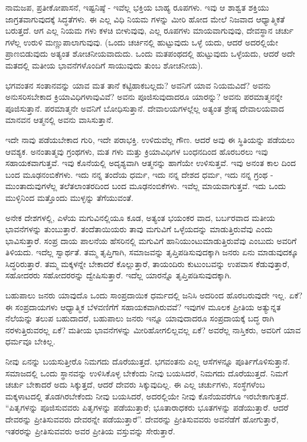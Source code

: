 ನಾಮಜಪ, ಪ್ರತೀಕೋಪಾಸನೆ, ಇಷ್ಟನಿಷ್ಠೆ - ಇವೆಲ್ಲ ಭಕ್ತಿಯ ಬಾಹ್ಯ ರೂಪಗಳು. ಇವು ಆ ಶಾಶ್ವತ ಶಕ್ತಿಯು ಜಾಗ್ರತವಾಗುವುದಕ್ಕೆ ಸಿದ್ಧತೆಗಳು. ಈ ಎಲ್ಲ ವಿಧಿ ನಿಯಮ ಗಳನ್ನು ಮೀರಿ ಹೋದ ಮೇಲೆ ನಿಜವಾದ ಆಧ್ಯಾತ್ಮಿಕತೆ ಬರುತ್ತದೆ. ಆಗ ಎಲ್ಲ ನಿಯಮ ಗಳು ಕಳಚಿ ಬೀಳುವುವು, ಎಲ್ಲ ರೂಪಗಳು ಮಾಯವಾಗುವುವು, ದೇವಸ್ಥಾನ ಚರ್ಚು ಗಳೆಲ್ಲ ಉರುಳಿ ಮಣ್ಣುಪಾಲಾಗುವುವು. (ಒಂದು ಚರ್ಚಿನಲ್ಲಿ ಹುಟ್ಟುವುದು ಒಳ್ಳೆ ಯದು, ಆದರೆ ಅದರಲ್ಲಿಯೇ ಪ್ರಾಣಬಿಡುವುದು ಅತ್ಯಂತ ಶೋಚನೀಯವಾದುದು. ಒಂದು ಮತಪಂಥದಲ್ಲಿ ಹುಟ್ಟುವುದು ಒಳ್ಳೆಯದು, ಆದರೆ ಅದೇ ಮತದಲ್ಲಿ ಮತೀಯ ಭಾವನೆಗಳೊಂದಿಗೆ ಸಾಯುವುದು ತುಂಬ ಶೋಚನೀಯ).

ಭಗವಂತನ ಸಂತಾನವನ್ನು ಯಾವ ಮತ ತಾನೆ ಕಟ್ಟಿಹಾಕಬಲ್ಲದು? ಅವನಿಗೆ ಯಾವ ನಿಯಮವಿದೆ? ಅವನು ಅನುಸರಿಸಬೇಕಾದ ಕ್ರಿಯಾವಿಧಿಗಳಾವುವಿವೆ? ಅವನು ಪೂಜಿಸುವುದಾದರೂ ಯಾರನ್ನು? ಅವನು ಪರಮಾತ್ಮನನ್ನೇ ಪೂಜಿಸುತ್ತಾನೆ. ಪರಮಾತ್ಮನೇ ಅವನಿಗೆ ಬೋಧಿಸುತ್ತಾನೆ. ದೇವಾಲಯಗಳಲ್ಲೆಲ್ಲ ಅತ್ಯಂತ ಶ್ರೇಷ್ಠ ದೇವಾಲಯವಾದ ಮಾನವನ ಆತ್ಮನಲ್ಲಿ ಅವನು ವಾಸಿಸುತ್ತಾನೆ.

ಇದೇ ನಾವು ಪಡೆಯಬೇಕಾದ ಗುರಿ, ಇದೇ ಪರಾಭಕ್ತಿ. ಉಳಿದುವೆಲ್ಲ ಗೌಣ. ಆದರೆ ಅವು ಈ ಸ್ಥಿತಿಯನ್ನು ಪಡೆಯಲು ಆವಶ್ಯಕ. ಅನಂತಾತ್ಮವು ಗ್ರಂಥಗಳು, ಮತ ಗಳು ಮತ್ತು ಕ್ರಿಯಾವಿಧಿಗಳ ಬಂಧನದಿಂದ ಹೊರಬರಲು ಇವು ಸಹಾಯಕವಾಗುತ್ತವೆ. ಇವು ಕೊನೆಯಲ್ಲಿ ಅದೃಶ್ಯವಾಗಿ ಆತ್ಮನನ್ನು ಹಾಗೆಯೇ ಉಳಿಸುತ್ತವೆ. ಇವು ಅನಂತ ಕಾಲ ದಿಂದ ಬಂದ ಮೂಢನಂಬಿಕೆಗಳು. ಇದು ನನ್ನ ತಂದೆಯ ಧರ್ಮ, ಇದು ನನ್ನ ದೇಶದ ಧರ್ಮ, ಇದು ನನ್ನ ಗ್ರಂಥ - ಮುಂತಾದುವುಗಳೆಲ್ಲ ತಲೆತಲಾಂತರದಿಂದ ಬಂದ ಮೂಢನಂಬಿಕೆಗಳು. ಇವೆಲ್ಲ ಮಾಯವಾಗುತ್ತವೆ. ಇದು ಒಂದು ಮುಳ್ಳಿನಿಂದ ಮತ್ತೊಂದು ಮುಳ್ಳನ್ನು ತೆಗೆಯುವಂತೆ.

ಅನೇಕ ದೇಶಗಳಲ್ಲಿ, ಎಳೆಯ ಮಗುವಿನಲ್ಲಿಯೂ ಕೂಡ, ಅತ್ಯಂತ ಭಯಂಕರ ವಾದ, ಬರ್ಬರವಾದ ಮತೀಯ ಭಾವನೆಗಳನ್ನು ತುಂಬುತ್ತಾರೆ. ತಂದೆತಾಯಿಯರು ತಾವು ಮಗುವಿಗೆ ಒಳ್ಳೆಯದನ್ನು ಮಾಡುತ್ತಿರುವೆವು ಎಂದು ಭಾವಿಸುತ್ತಾರೆ. ಸಂಪ್ರ ದಾಯ ಪಾಲನೆಯ ಹೆಸರಿನಲ್ಲಿ ಮಗುವಿಗೆ ಹಾನಿಯುಂಟುಮಾಡುತ್ತಿರುವೆವು ಎಂಬುದು ಅವರಿಗೆ ತಿಳಿಯದು. ಇದೆಲ್ಲ ಸ್ವಾರ್ಥತೆ. ತಮ್ಮ ತೃಪ್ತಿಗಾಗಿ, ಸಮಾಜವನ್ನು ತೃಪ್ತಿಪಡಿಸುವುದಕ್ಕಾಗಿ ಜನರು ಏನು ಮಾಡುವುದಕ್ಕೂ ಸಿದ್ಧರಿರುತ್ತಾರೆ. ತಮ್ಮ ಮಕ್ಕಳನ್ನೇ ಬೇಕಾದರೆ ಕೊಲ್ಲುತ್ತಾರೆ, ತಾಯಂದಿರು ಕುಟುಂಬವನ್ನು ಉಪವಾಸ ಕೆಡುವುತ್ತಾರೆ, ಸಹೋದರರು ಸಹೋದರರನ್ನು ದ್ವೇಷಿಸುತ್ತಾರೆ. ಇದೆಲ್ಲ ಯಾರನ್ನೊ ತೃಪ್ತಿಪಡಿಸುವುದಕ್ಕಾಗಿ.

ಬಹುಪಾಲು ಜನರು ಯಾವುದೊ ಒಂದು ಸಾಂಪ್ರದಾಯಿಕ ಧರ್ಮದಲ್ಲಿ ಜನಿಸಿ ಅದರಿಂದ ಹೊರಬರುವುದೇ ಇಲ್ಲ. ಏಕೆ? ಈ ಸಂಪ್ರದಾಯಗಳು ಆಧ್ಯಾತ್ಮಿಕ ಬೆಳವಣಿಗೆಗೆ ಸಹಾಯಕವಾಗಿರುವವೆ? ಇವುಗಳ ಮೂಲಕ ಪ್ರೀತಿಯ ಅತ್ಯುನ್ನತ ನೆಲೆಯನ್ನು ತಲುಪ ಬಹುದಾದರೆ, ಬಹುಪಾಲು ಜನರು ಇನ್ನೂ ಯಾವುದಾದರೂ ಸಂಪ್ರದಾಯಕ್ಕೆ ಬದ್ಧ ರಾಗಿ ನರಳುತ್ತಿರುವರಲ್ಲ ಏಕೆ? ಮತೀಯ ಭಾವನೆಗಳನ್ನು ಮೀರಿಹೋಗಲಿಲ್ಲವಲ್ಲ ಏಕೆ? ಅವರೆಲ್ಲ ನಾಸ್ತಿಕರು, ಅವರಿಗೆ ಯಾವ ಧರ್ಮವೂ ಬೇಕಿಲ್ಲ.

ನೀವು ಏನನ್ನು ಬಯಸುತ್ತೀರೊ ನಿಮಗದು ದೊರೆಯುತ್ತದೆ. ಭಗವಂತನು ಎಲ್ಲ ಆಸೆಗಳನ್ನೂ ಪೂರ್ತಿಗೊಳಿಸುತ್ತಾನೆ. ಸಮಾಜದಲ್ಲಿ ಒಂದು ಸ್ಥಾನವನ್ನು ಉಳಿಸಿಕೊಳ್ಳ ಬೇಕೆಂದು ನೀವು ಬಯಸಿದರೆ, ನಿಮಗದು ದೊರೆಯುತ್ತದೆ. ನಿಮಗೆ ಚರ್ಚು ಬೇಕಾದರೆ ಅದು ಸಿಕ್ಕುತ್ತದೆ, ಆದರೆ ದೇವರು ಸಿಕ್ಕುವುದಿಲ್ಲ. ಈ ಎಲ್ಲ ಚರ್ಚುಗಳು, ಸಂಸ್ಥೆಗಳೆಂಬ ಮಕ್ಕಳಾಟದಲ್ಲಿ ತೊಡಗಿರಬೇಕೆಂದು ನೀವು ಬಯಸಿದರೆ, ಅದರಲ್ಲಿಯೇ ನೀವು ಕೊನೆಯವರೆಗೂ ಇರಬೇಕಾಗುತ್ತದೆ. “ಪಿತೃಗಳನ್ನು ಪೂಜಿಸುವವರು ಪಿತೃಗಳನ್ನು ಪಡೆಯುತ್ತಾರೆ; ಭೂತಾರಾಧಕರು ಭೂತಗಳನ್ನು ಪಡೆಯುತ್ತಾರೆ. ಆದರೆ ದೇವರನ್ನು ಪ್ರೀತಿಸುವವರು ದೇವರನ್ನೇ ಪಡೆಯುತ್ತಾರೆ”. ದೇವರನ್ನು ಪ್ರೀತಿಸುವವರು ಅವನೆಡೆಗೆ ಹೋಗುತ್ತಾರೆ, ಇತರರನ್ನು ಪ್ರೀತಿಸುವವರು ಅವರ ಪ್ರೀತಿಯ ವಸ್ತುವನ್ನು ಸೇರುತ್ತಾರೆ.

